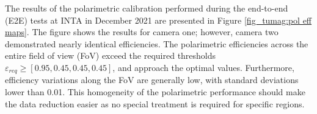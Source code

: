 The results of the polarimetric calibration performed during the end-to-end (E2E) tests at INTA in December 2021 are presented in Figure \ref{fig_tumag:pol eff maps}. The figure shows the results for camera one; however, camera two demonstrated nearly identical efficiencies. The polarimetric efficiencies across the entire field of view (FoV) exceed the required thresholds $\varepsilon _{req} \geqslant [0.95, 0.45, 0.45, 0.45]$, and approach the optimal values. Furthermore, efficiency variations along the FoV are generally low, with standard deviations lower than 0.01. This homogeneity of the polarimetric performance should make the data reduction easier as no special treatment is required for specific regions.  